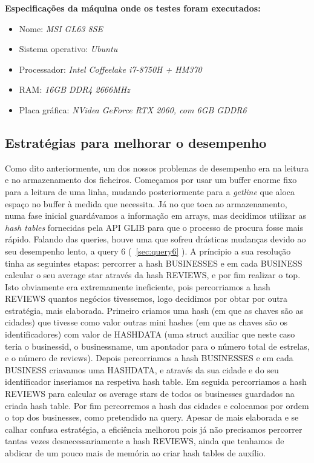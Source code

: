 \documentclass[a4paper]{article}
\begin{document}
\textbf{Especificações da máquina onde os testes foram executados:}
\begin{itemize}
    \item Nome: \textit{MSI GL63 8SE}
    \item Sistema operativo: \textit{Ubuntu}
    \item Processador: \textit{Intel Coffeelake i7-8750H + HM370} 
    \item RAM: \textit{16GB DDR4 2666MHz}
    \item Placa gráfica: \textit{NVidea GeForce RTX 2060, com 6GB GDDR6}
\end{itemize}

\subsection{Estratégias para melhorar o desempenho}
\label{sec:desempenho}

Como dito anteriormente, um dos nossos problemas de desempenho era na leitura e no armazenamento dos ficheiros. Começamos por usar um buffer enorme fixo para a leitura de uma linha, mudando posteriormente para a \textit{getline} que aloca espaço no buffer à medida que necessita. Já no que toca ao armazenamento, numa fase inicial guardávamos a informação em arrays, mas decidimos utilizar as \textit{hash tables} fornecidas pela API GLIB para que o processo de procura fosse mais rápido. 
Falando das queries, houve uma que sofreu drásticas mudanças devido ao seu desempenho lento, a query 6 (~\ref{sec:query6} ). A príncipio a sua resolução tinha as seguintes etapas: percorrer a hash BUSINESSES e em cada BUSINESS calcular o seu average star através da hash REVIEWS, e por fim realizar o top. Isto obviamente era extremamente ineficiente, pois percorriamos a hash REVIEWS quantos negócios tivessemos, logo decidimos por obtar por outra estratégia, mais elaborada. Primeiro criamos uma hash (em que as chaves são as cidades) que tivesse como valor outras mini hashes (em que as chaves são os identificadores) com valor de HASHDATA (uma struct auxiliar que neste caso teria o business\textunderscore id, o business\textunderscore name, um apontador para o número total de estrelas, e o número de reviews). Depois percorriamos a hash BUSINESSES e em cada BUSINESS criavamos uma HASHDATA, e através da sua cidade e do seu identificador inseriamos na respetiva hash table. Em seguida percorriamos a hash REVIEWS para calcular os average stars de todos os businesses guardados na criada hash table. Por fim percorremos a hash das cidades e colocamos por ordem o top dos businesses, como pretendido na query. Apesar de mais elaborada e se calhar confusa estratégia, a eficiência melhorou pois já não precisamos percorrer tantas vezes desnecessariamente a hash REVIEWS, ainda que tenhamos de abdicar de um pouco mais de memória ao criar hash tables de auxílio.
\end{document}
